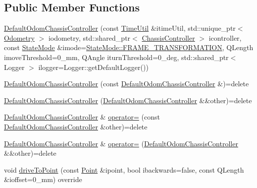 \subsection*{Public Member Functions}
\begin{DoxyCompactItemize}
\item 
\mbox{\hyperlink{classokapi_1_1DefaultOdomChassisController_ab0b6772507b1e7dc25aea0612ffffbab}{Default\+Odom\+Chassis\+Controller}} (const \mbox{\hyperlink{classokapi_1_1TimeUtil}{Time\+Util}} \&itime\+Util, std\+::unique\+\_\+ptr$<$ \mbox{\hyperlink{classokapi_1_1Odometry}{Odometry}} $>$ iodometry, std\+::shared\+\_\+ptr$<$ \mbox{\hyperlink{classokapi_1_1ChassisController}{Chassis\+Controller}} $>$ icontroller, const \mbox{\hyperlink{namespaceokapi_af37fbd761bd859a00ff4dd4a87dd8c07}{State\+Mode}} \&imode=\mbox{\hyperlink{namespaceokapi_af37fbd761bd859a00ff4dd4a87dd8c07ad5ed7666e5cebf60d3af20a5a46edf3b}{State\+Mode\+::\+F\+R\+A\+M\+E\+\_\+\+T\+R\+A\+N\+S\+F\+O\+R\+M\+A\+T\+I\+ON}}, Q\+Length imove\+Threshold=0\+\_\+mm, Q\+Angle iturn\+Threshold=0\+\_\+deg, std\+::shared\+\_\+ptr$<$ Logger $>$ ilogger=\+Logger\+::get\+Default\+Logger())
\item 
\mbox{\hyperlink{classokapi_1_1DefaultOdomChassisController_a93e8f16e2f9d162d14a2aec69e969cdb}{Default\+Odom\+Chassis\+Controller}} (const \mbox{\hyperlink{classokapi_1_1DefaultOdomChassisController}{Default\+Odom\+Chassis\+Controller}} \&)=delete
\item 
\mbox{\hyperlink{classokapi_1_1DefaultOdomChassisController_a08eb9b5f888b80392ce9b6652b9eaa4c}{Default\+Odom\+Chassis\+Controller}} (\mbox{\hyperlink{classokapi_1_1DefaultOdomChassisController}{Default\+Odom\+Chassis\+Controller}} \&\&other)=delete
\item 
\mbox{\hyperlink{classokapi_1_1DefaultOdomChassisController}{Default\+Odom\+Chassis\+Controller}} \& \mbox{\hyperlink{classokapi_1_1DefaultOdomChassisController_a1afd04cb4449601d959bcdc7d03091ae}{operator=}} (const \mbox{\hyperlink{classokapi_1_1DefaultOdomChassisController}{Default\+Odom\+Chassis\+Controller}} \&other)=delete
\item 
\mbox{\hyperlink{classokapi_1_1DefaultOdomChassisController}{Default\+Odom\+Chassis\+Controller}} \& \mbox{\hyperlink{classokapi_1_1DefaultOdomChassisController_ab8d67b8e5ded9fb80dd7538f96fe7e59}{operator=}} (\mbox{\hyperlink{classokapi_1_1DefaultOdomChassisController}{Default\+Odom\+Chassis\+Controller}} \&\&other)=delete
\item 
void \mbox{\hyperlink{classokapi_1_1DefaultOdomChassisController_ad89098abcab5e9f333cb3c70c9e8299f}{drive\+To\+Point}} (const \mbox{\hyperlink{structokapi_1_1Point}{Point}} \&ipoint, bool ibackwards=false, const Q\+Length \&ioffset=0\+\_\+mm) override

\end{DoxyCompactItemize}
